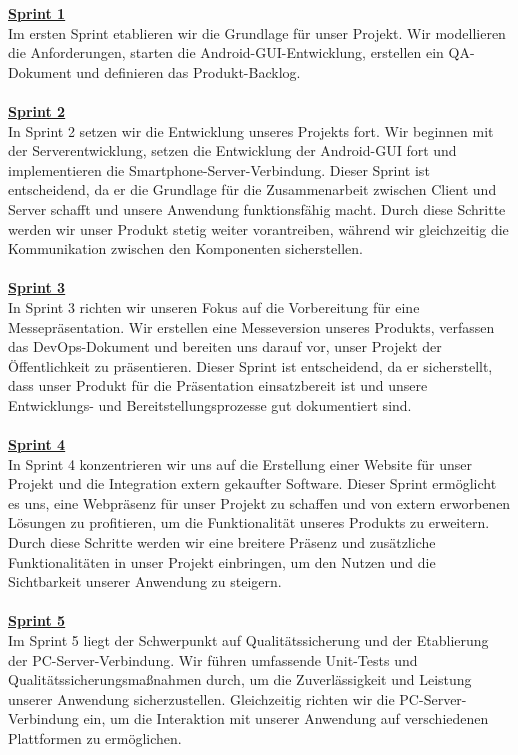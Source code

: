 \documentclass[11pt]{article}
\begin{document}
\textbf{\large{\underline{Sprint 1}}} \\
Im ersten Sprint etablieren wir die Grundlage für unser Projekt. Wir modellieren die Anforderungen, starten die Android-GUI-Entwicklung, erstellen ein QA-Dokument und definieren das Produkt-Backlog.\\
\\
\textbf{\large{\underline{Sprint 2}}} \\
In Sprint 2 setzen wir die Entwicklung unseres Projekts fort. Wir beginnen mit der Serverentwicklung, setzen die Entwicklung der Android-GUI fort und implementieren die Smartphone-Server-Verbindung. Dieser Sprint ist entscheidend, da er die Grundlage für die Zusammenarbeit zwischen Client und Server schafft und unsere Anwendung funktionsfähig macht. Durch diese Schritte werden wir unser Produkt stetig weiter vorantreiben, während wir gleichzeitig die Kommunikation zwischen den Komponenten sicherstellen.\\
\\
\textbf{\large{\underline{Sprint 3}}} \\
In Sprint 3 richten wir unseren Fokus auf die Vorbereitung für eine Messepräsentation. Wir erstellen eine Messeversion unseres Produkts, verfassen das DevOps-Dokument und bereiten uns darauf vor, unser Projekt der Öffentlichkeit zu präsentieren. Dieser Sprint ist entscheidend, da er sicherstellt, dass unser Produkt für die Präsentation einsatzbereit ist und unsere Entwicklungs- und Bereitstellungsprozesse gut dokumentiert sind.\\
\\
\textbf{\large{\underline{Sprint 4}}} \\
In Sprint 4 konzentrieren wir uns auf die Erstellung einer Website für unser Projekt und die Integration extern gekaufter Software. Dieser Sprint ermöglicht es uns, eine Webpräsenz für unser Projekt zu schaffen und von extern erworbenen Lösungen zu profitieren, um die Funktionalität unseres Produkts zu erweitern. Durch diese Schritte werden wir eine breitere Präsenz und zusätzliche Funktionalitäten in unser Projekt einbringen, um den Nutzen und die Sichtbarkeit unserer Anwendung zu steigern.\\
\\
\textbf{\large{\underline{Sprint 5}}} \\
Im Sprint 5 liegt der Schwerpunkt auf Qualitätssicherung und der Etablierung der PC-Server-Verbindung. Wir führen umfassende Unit-Tests und Qualitätssicherungsmaßnahmen durch, um die Zuverlässigkeit und Leistung unserer Anwendung sicherzustellen. Gleichzeitig richten wir die PC-Server-Verbindung ein, um die Interaktion mit unserer Anwendung auf verschiedenen Plattformen zu ermöglichen.\\
\end{document}
